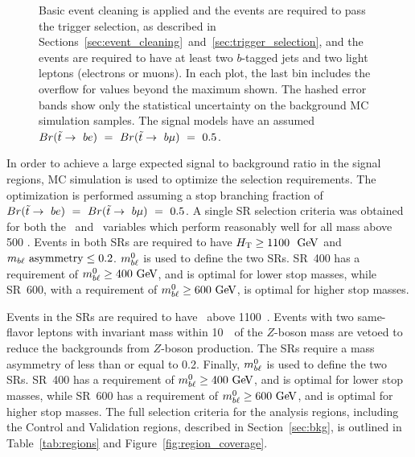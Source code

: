 \begin{figure}
{    Basic event cleaning is applied and the events are required to pass the
    trigger selection, as described in
    Sections~\ref{sec:event_cleaning}~and~\ref{sec:trigger_selection}, and the
    events are required to have at least two $b$-tagged jets and two light
    leptons (electrons or muons).
    In each plot, the last bin includes the overflow for values beyond the
    maximum shown. The hashed error bands show only the statistical
    uncertainty on the background MC simulation samples. The signal
    models have an assumed
    $Br(\tilde{t}\rightarrow~be)~=~Br(\tilde{t}\rightarrow~b\mu)~=~0.5$.
  }
  \label{fig:no_data__no_k__inclusive_flavor_all__kinematic_dists}
\end{figure}

In order to achieve a large expected signal to background ratio in the signal
regions, MC simulation is used to optimize the selection requirements.
The optimization is performed assuming a stop branching fraction of
$Br(\tilde{t}\rightarrow~be)~=~Br(\tilde{t}\rightarrow~b\mu)~=~0.5$.
A single SR selection criteria was obtained for both the \HT\ and
\MBLASYM\ variables which perform reasonably well for all mass above 500 \GeV.
Events in both SRs are required to have $\HT \geq 1100~\GeV$ and
$m_{b\ell}~\mathrm{asymmetry} \leq 0.2$.
$m_{b\ell}^0$ is used to define the two SRs.
SR~400 has a requirement of $\MBL^0 \geq 400 \GeV$, and is optimal for lower
stop masses, while SR~600, with a requirement of $\MBL^0 \geq 600 \GeV$, is
optimal for higher stop masses.

Events in the SRs are required to have \HT\ above 1100~\GeV.
Events with two same-flavor leptons with invariant mass within 10~\GeV\ of the
$Z$-boson mass are vetoed to reduce the backgrounds from $Z$-boson production.
The SRs require a mass asymmetry of less than or equal to 0.2.
Finally, $m_{b\ell}^0$ is used to define the two SRs.
SR~400 has a requirement of $\MBL^0 \geq 400 \GeV$, and is optimal for lower
stop masses, while SR~600 has a requirement of $\MBL^0 \geq 600 \GeV$, and is
optimal for higher stop masses.
The full selection criteria for the analysis regions, including the Control and
Validation regions, described in Section~\ref{sec:bkg}, is outlined in
Table~\ref{tab:regions} and Figure~\ref{fig:region_coverage}.

